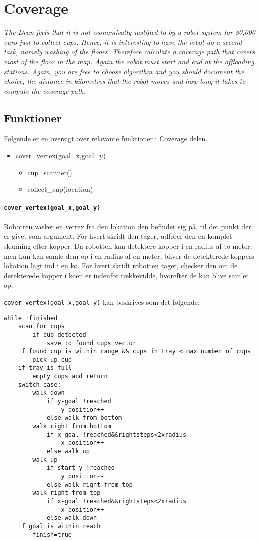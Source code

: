 \section{Coverage}
\label{sec:cov}
\textit{The Dean feels that it is not economically justified to by a robot system for 80.000 euro just to collect cups. Hence, it is interesting to have the robot do a second task, namely washing of the floors. Therefore calculate a coverage path that covers most of the floor in the map. Again the robot must start and end at the offloading stations.
Again, you are free to choose algorithm and you should document the choice, the distance in kilometres that the robot moves and how long it takes to compute the coverage path.}


\subsection{Funktioner}

Følgende er en oversigt over relavante funktioner i Coverage delen.

\begin{itemize}
	\item cover\_vertex(goal\_x,goal\_y)
	\begin{itemize}
		\item cup\_scanner()
		\item collect\_cup(location)
	\end{itemize}
	
\end{itemize}

\paragraph{\texttt{cover\_vertex(goal\_x,goal\_y)}}
Robotten vasker en vertex fra den lokation den befinder sig på, til det punkt der er givet som argument. For hvert skridt den tager, udfører den en komplet skanning efter kopper. Da robotten kan detektere kopper i en radius af to meter, men kun kan samle dem op i en radius af en meter, bliver de detekterede koppers lokation lagt ind i en kø. For hvert skridt robotten tager, checker den om de detekterede kopper i køen er indenfor rækkevidde, hvorefter de kan blive samlet op.

\texttt{cover\_vertex(goal\_x,goal\_y)} kan beskrives som det følgende:
\begin{lstlisting}
while !finished
	scan for cups
		if cup detected
			save to found cups vector
	if found cup is within range && cups in tray < max number of cups
		pick up cup
	if tray is full
		empty cups and return
	switch case:
		walk down 
			if y-goal !reached
				y position++
			else walk from bottom
		walk right from bottom 
			if x-goal !reached&&rightsteps<2xradius
				x position++
			else walk up
		walk up
			if start y !reached
				y position--
			else walk right from top
		walk right from top
			if x-goal !reached&&rightsteps<2xradius
				x position++
			else walk down
	if goal is within reach
		finish=true
\end{lstlisting}


